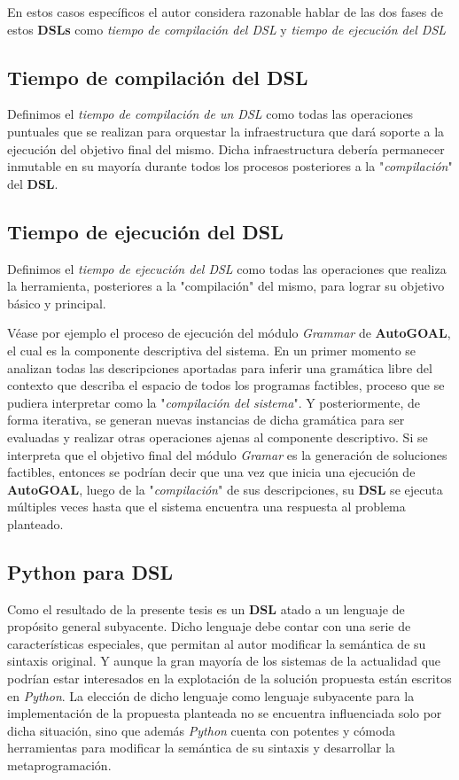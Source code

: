 En estos casos específicos el autor considera razonable hablar de las dos fases de
estos {\bf DSLs} como {\it tiempo de compilación del DSL} y
    {\it tiempo de ejecución del DSL}

\subsection{Tiempo de compilación del DSL}


Definimos el {\it tiempo de compilación de un DSL} como todas las operaciones puntuales que se
realizan para orquestar la infraestructura que dará soporte a la ejecución del objetivo
final del mismo. Dicha infraestructura debería permanecer inmutable en su mayoría
durante todos los procesos posteriores a la "{\it compilación}" del {\bf DSL}.

\subsection{Tiempo de ejecución del DSL}


Definimos el {\it tiempo de ejecución del DSL} como todas las operaciones que realiza
la herramienta, posteriores a la "compilación" del mismo, para lograr su objetivo básico y
principal.

Véase por ejemplo el proceso de ejecución del módulo {\it Grammar} de {\bf AutoGOAL}, el cual es
la componente descriptiva del sistema. En un primer momento se analizan todas las descripciones
aportadas para inferir una gramática libre del contexto que describa el espacio de todos los
programas factibles, proceso que se pudiera interpretar como la "{\it compilación del sistema}". Y
posteriormente, de forma iterativa, se generan nuevas instancias de dicha gramática para ser
evaluadas y realizar otras operaciones ajenas al componente descriptivo. Si se interpreta que
el objetivo final del módulo {\it Gramar} es la generación de soluciones factibles, entonces se
podrían decir que una vez que inicia una ejecución de {\bf AutoGOAL}, luego de la "{\it compilación}"
de sus descripciones, su {\bf DSL} se ejecuta múltiples veces hasta que el sistema encuentra una
respuesta al problema planteado.

\subsection{Python para DSL}

Como el resultado de la presente tesis es un {\bf DSL} atado a un lenguaje de propósito general
subyacente. Dicho lenguaje debe contar con una serie de características especiales,
que permitan al autor modificar la semántica de su sintaxis original. Y aunque la gran mayoría
de los sistemas de la actualidad que podrían estar interesados en la explotación de la solución
propuesta están escritos en {\it Python}. La elección de dicho lenguaje como lenguaje subyacente
para la implementación de la propuesta planteada no se encuentra influenciada solo por dicha
situación, sino que además {\it Python} cuenta con potentes y cómoda herramientas para modificar
la semántica de su sintaxis y desarrollar la metaprogramación.

